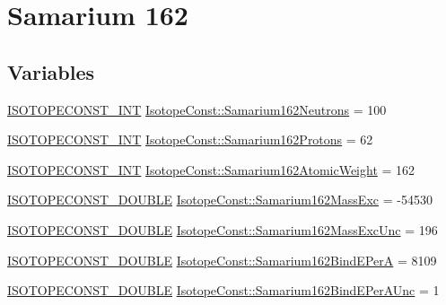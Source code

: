 \hypertarget{group___isotope_const-_samarium-_sm162}{}\section{Samarium 162}
\label{group___isotope_const-_samarium-_sm162}
\subsection*{Variables}
\begin{DoxyCompactItemize}
\item 
\mbox{\hyperlink{group___isotope_const-_macros_ga5f18360b3e99483a35c32d789e62621c}{I\+S\+O\+T\+O\+P\+E\+C\+O\+N\+S\+T\+\_\+\+I\+NT}} \mbox{\hyperlink{group___isotope_const-_samarium-_sm162_ga0455ef0bcc776c2f7600cf58d062fcc6}{Isotope\+Const\+::\+Samarium162\+Neutrons}} = 100
\item 
\mbox{\hyperlink{group___isotope_const-_macros_ga5f18360b3e99483a35c32d789e62621c}{I\+S\+O\+T\+O\+P\+E\+C\+O\+N\+S\+T\+\_\+\+I\+NT}} \mbox{\hyperlink{group___isotope_const-_samarium-_sm162_ga2c2af5b1162061122ba37ddcf2151baa}{Isotope\+Const\+::\+Samarium162\+Protons}} = 62
\item 
\mbox{\hyperlink{group___isotope_const-_macros_ga5f18360b3e99483a35c32d789e62621c}{I\+S\+O\+T\+O\+P\+E\+C\+O\+N\+S\+T\+\_\+\+I\+NT}} \mbox{\hyperlink{group___isotope_const-_samarium-_sm162_ga34923d1979243a74fd652f9600edee42}{Isotope\+Const\+::\+Samarium162\+Atomic\+Weight}} = 162
\item 
\mbox{\hyperlink{group___isotope_const-_macros_ga8f45a7272ce02c0b4c65c44636ed719a}{I\+S\+O\+T\+O\+P\+E\+C\+O\+N\+S\+T\+\_\+\+D\+O\+U\+B\+LE}} \mbox{\hyperlink{group___isotope_const-_samarium-_sm162_ga40313530518b09154cb9034c4a181421}{Isotope\+Const\+::\+Samarium162\+Mass\+Exc}} = -\/54530
\item 
\mbox{\hyperlink{group___isotope_const-_macros_ga8f45a7272ce02c0b4c65c44636ed719a}{I\+S\+O\+T\+O\+P\+E\+C\+O\+N\+S\+T\+\_\+\+D\+O\+U\+B\+LE}} \mbox{\hyperlink{group___isotope_const-_samarium-_sm162_ga321a67a4227f617f18d7c3b7bb5a7333}{Isotope\+Const\+::\+Samarium162\+Mass\+Exc\+Unc}} = 196
\item 
\mbox{\hyperlink{group___isotope_const-_macros_ga8f45a7272ce02c0b4c65c44636ed719a}{I\+S\+O\+T\+O\+P\+E\+C\+O\+N\+S\+T\+\_\+\+D\+O\+U\+B\+LE}} \mbox{\hyperlink{group___isotope_const-_samarium-_sm162_gac2b5532bd71b3596fb56d0aa07f8e49c}{Isotope\+Const\+::\+Samarium162\+Bind\+E\+PerA}} = 8109
\item 
\mbox{\hyperlink{group___isotope_const-_macros_ga8f45a7272ce02c0b4c65c44636ed719a}{I\+S\+O\+T\+O\+P\+E\+C\+O\+N\+S\+T\+\_\+\+D\+O\+U\+B\+LE}} \mbox{\hyperlink{group___isotope_const-_samarium-_sm162_gaacd5cda993d94b31db1954a3fdcc0304}{Isotope\+Const\+::\+Samarium162\+Bind\+E\+Per\+A\+Unc}} = 1

\end{DoxyCompactItemize}
